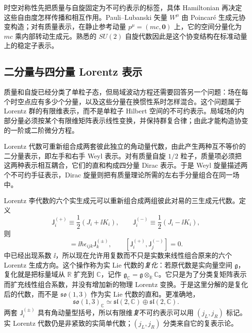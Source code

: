 时空对称性先把质量与自旋固定为不可约表示的标签，具体 Hamiltonian 再决定这些自由度怎样传播和相互作用。Pauli--Lubanski 矢量 $W^\mu$ 由 Poincar\'e 生成元协变构造；对有质量表示，在静止参考动量 $p^\mu=(mc,\mathbf0)$ 上，它的空间分量化为 $mc$ 乘内部转动生成元。熟悉的 $SU(2)$ 自旋代数因此是这个协变结构在标准动量上的稳定子表示。



\subsection{二分量与四分量 Lorentz 表示}\label{sec:feqo-dirac-from-dispersion}

质量和自旋已经分类了单粒子态，但局域波动方程还需要回答另一个问题：场在每个时空点应有多少个分量，以及这些分量在换惯性系时怎样混合。这个问题属于 Lorentz 群的有限维表示，而不是单粒子 Hilbert 空间的不可约表示。局域场的内部分量必须按某个有限维矩阵表示线性变换，并保持群复合律；由此才能构造协变的一阶或二阶微分方程。

Lorentz 代数可重新组合成两套彼此独立的角动量代数，由此产生两种互不等价的二分量表示，即左手和右手 Weyl 表示。对有质量自旋 $1/2$ 粒子，质量项必须把这两种表示相互耦合，它们的直和构成四分量 Dirac 表示。于是 Weyl 旋量描述两个不可约手征表示，Dirac 旋量则把有质量理论所需的左右手分量组合在同一场中。



Lorentz 李代数的六个实生成元可以重新组合成两组彼此对易的三生成元代数。定义
\begin{equation}
 \mathsf J_i^{(+)}\equiv\frac12(J_i+\ii K_i),
 \qquad
 \mathsf J_i^{(-)}\equiv\frac12(J_i-\ii K_i),
 \label{eq:lorentz-su2-generators-r15}
\end{equation}
则
\begin{equation}
 [\mathsf J_i^{(\pm)},\mathsf J_j^{(\pm)}]
 =\ii\hbar\epsilon_{ijk}\mathsf J_k^{(\pm)},
 \qquad
 [\mathsf J_i^{(+)},\mathsf J_j^{(-)}]=0.
 \label{eq:lorentz-su2-algebra-dp34}
\end{equation}
 中已经出现系数 $\ii$，所以现在允许用复数而不只是实数来线性组合原来的六个 Lorentz 生成方向。这个操作称为实 Lie 代数的\emph{复化}：若原代数是实向量空间 $\mathfrak g$，复化就是把标量域从 $\mathbb R$ 扩充到 $\mathbb C$，记作 $\mathfrak g_{\mathbb C}=\mathfrak g\otimes_{\mathbb R}\mathbb C$。它只是为了分类复矩阵表示而扩充线性组合系数，并没有增加新的物理 Lorentz 变换。于是这里分解的是复化后的代数，而不是 $\mathfrak{so}(1,3)$ 作为实 Lie 代数的直和。更准确地，
\begin{equation}
 \boxed{
 \mathfrak{so}(1,3)_\mathbb C
 \simeq
 \mathfrak{sl}(2,\mathbb C)\oplus\mathfrak{sl}(2,\mathbb C).}
 \label{eq:lorentz-complexified-decomposition-dp75}
\end{equation}
两套 $\mathsf J_i^{(\pm)}$ 具有角动量型括号，所以有限维\emph{复}不可约表示可以用 $(j_L,j_R)$ 标记。实 Lorentz 代数仍是非紧致的实简单代数；$(j_L,j_R)$ 分类来自它的复表示论。

